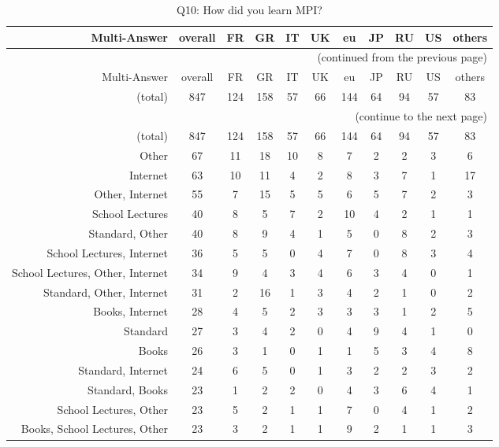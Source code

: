 \clearpage%
{\footnotesize\begin{landscape}%
\begin{longtable}[htb]{r|c|c|c|c|c|c|c|c|c|c}%
\caption{Q10: How did you learn MPI?}%
\label{tab:Q10-mans} \\%
\hline%
Multi-Answer & overall & FR & GR & IT & UK & eu & JP & RU & US & others \\
 \hline%
\endfirsthead%
\multicolumn{11}{r}{(continued from the previous page)}\\%
\hline%
Multi-Answer & overall & FR & GR & IT & UK & eu & JP & RU & US & others \\
 \hline%
\endhead%
\hline%
(total) & 847 & 124 & 158 & 57 & 66 & 144 & 64 & 94 & 57 & 83 \\%
\hline%
\multicolumn{11}{r}{(continue to the next page)}\\%
\endfoot%
\hline%
(total) & 847 & 124 & 158 & 57 & 66 & 144 & 64 & 94 & 57 & 83 \\%
\hline%
\endlastfoot%
\hline%
{Other} & 67 & 11 & 18 & 10 & 8 & 7 & 2 & 2 & 3 & 6 \\%
{Internet} & 63 & 10 & 11 & 4 & 2 & 8 & 3 & 7 & 1 & 17 \\%
{Other, Internet} & 55 & 7 & 15 & 5 & 5 & 6 & 5 & 7 & 2 & 3 \\%
{School Lectures} & 40 & 8 & 5 & 7 & 2 & 10 & 4 & 2 & 1 & 1 \\%
{Standard, Other} & 40 & 8 & 9 & 4 & 1 & 5 & 0 & 8 & 2 & 3 \\%
{School Lectures, Internet} & 36 & 5 & 5 & 0 & 4 & 7 & 0 & 8 & 3 & 4 \\%
{School Lectures, Other, Internet} & 34 & 9 & 4 & 3 & 4 & 6 & 3 & 4 & 0 & 1 \\%
{Standard, Other, Internet} & 31 & 2 & 16 & 1 & 3 & 4 & 2 & 1 & 0 & 2 \\%
{Books, Internet} & 28 & 4 & 5 & 2 & 3 & 3 & 3 & 1 & 2 & 5 \\%
{Standard} & 27 & 3 & 4 & 2 & 0 & 4 & 9 & 4 & 1 & 0 \\%
{Books} & 26 & 3 & 1 & 0 & 1 & 1 & 5 & 3 & 4 & 8 \\%
{Standard, Internet} & 24 & 6 & 5 & 0 & 1 & 3 & 2 & 2 & 3 & 2 \\%
{Standard, Books} & 23 & 1 & 2 & 2 & 0 & 4 & 3 & 6 & 4 & 1 \\%
{School Lectures, Other} & 23 & 5 & 2 & 1 & 1 & 7 & 0 & 4 & 1 & 2 \\%
{Books, School Lectures, Other} & 23 & 3 & 2 & 1 & 1 & 9 & 2 & 1 & 1 & 3 \\%

\end{longtable}
\end{landscape}}
